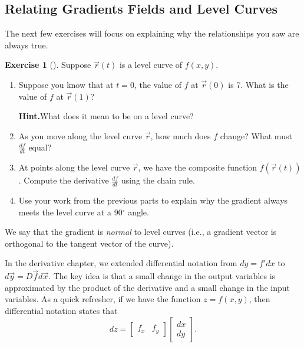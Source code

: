\documentclass[10pt,]{book}
\theoremstyle{plain}
\theoremstyle{definition}
\theoremstyle{definition}
\theoremstyle{definition}
\theoremstyle{definition}
\newtheorem{exploration}[project]{Exercise}
\theoremstyle{definition}
\numberwithin{equation}{section}
\newcommand{\ds}{\displaystyle}
\newcommand{\amp}{&}
\begin{document}
\subsection[{Relating Gradients Fields and Level Curves}]{Relating Gradients Fields and Level Curves}\label{subsection-57}
The next few exercises will focus on explaining why the relationships you saw are always true.%
\begin{exploration}[]\label{exploration-223}
Suppose \(\vec r(t)\) is a level curve of \(f(x,y)\).%
\begin{enumerate}[font=\bfseries,label=(\alph*),ref=\alph*]
\item\label{task-594} Suppose you know that at \(t=0\), the value of \(f\) at \(\vec r(0)\) is 7.  What is the value of \(f\) at \(\vec r(1)\)?%
\par\medskip\noindent%
\textbf{Hint.}\quad What does it mean to be on a level curve?%
\item\label{task-595} As you move along the level curve \(\vec r\), how much does \(f\) change?  What must \(\ds\frac{df}{dt}\) equal?%
\item\label{task-596} At points along the level curve \(\vec r\), we have the composite function \(f(\vec r(t))\).  Compute the derivative \(\ds\frac{df}{dt}\) using the chain rule.%
\item\label{task-597} Use your work from the previous parts to explain why the gradient always meets the level curve at a 90\(^\circ\) angle.%
\end{enumerate}
\bigbreak
We say that the gradient is \emph{normal} to level curves (i.e., a gradient vector is orthogonal to the tangent vector of the curve).%
\end{exploration}
In the derivative chapter, we extended differential notation from \(dy=f' dx\) to \(d\vec y = D\vec f d\vec x\). The key idea is that a small change in the output variables is approximated by the product of the derivative and a small change in the input variables. As a quick refresher, if we have the function \(z=f(x,y)\), then differential notation states that%
\begin{equation*}
dz = \begin{bmatrix}f_x\amp f_y
\end{bmatrix}  \begin{bmatrix}dx\\dy
\end{bmatrix} .
\end{equation*}
%
\end{document}

